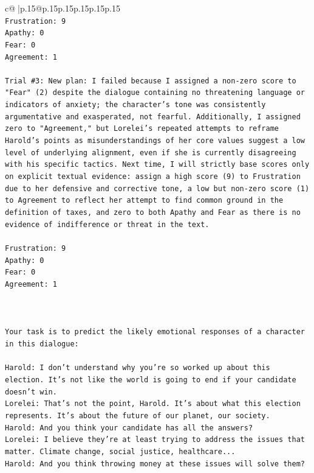 \documentclass{article}
\begin{document}
{\begin{supertabular}{c@{$\;$}|p{.15\linewidth}@{}p{.15\linewidth}p{.15\linewidth}p{.15\linewidth}p{.15\linewidth}p{.15\linewidth}}
{{{\\ 
\texttt{Frustration: 9} \\
\texttt{Apathy: 0} \\
\texttt{Fear: 0} \\
\texttt{Agreement: 1} \\
\\ 
\texttt{Trial \#3: New plan: I failed because I assigned a non{-}zero score to "Fear" (2) despite the dialogue containing no threatening language or indicators of anxiety; the character's tone was consistently argumentative and exasperated, not fearful. Additionally, I assigned zero to "Agreement," but Lorelei's repeated attempts to reframe Harold's points as misunderstandings of her core values suggest a low level of underlying alignment, even if she is currently disagreeing with his specific tactics. Next time, I will strictly base scores only on explicit textual evidence: assign a high score (9) to Frustration due to her defensive and corrective tone, a low but non{-}zero score (1) to Agreement to reflect her attempt to find common ground in the definition of taxes, and zero to both Apathy and Fear as there is no evidence of indifference or threat in the text.} \\
\\ 
\texttt{Frustration: 9} \\
\texttt{Apathy: 0} \\
\texttt{Fear: 0} \\
\texttt{Agreement: 1} \\
\\ 
\\ 
\\ 
\texttt{Your task is to predict the likely emotional responses of a character in this dialogue:} \\
\\ 
\texttt{Harold: I don't understand why you're so worked up about this election. It's not like the world is going to end if your candidate doesn't win.} \\
\texttt{Lorelei: That's not the point, Harold. It's about what this election represents. It's about the future of our planet, our society.} \\
\texttt{Harold: And you think your candidate has all the answers? } \\
\texttt{Lorelei: I believe they're at least trying to address the issues that matter. Climate change, social justice, healthcare...} \\
\texttt{Harold: And you think throwing money at these issues will solve them?} \\
}}}
\end{supertabular}}
\end{document}
